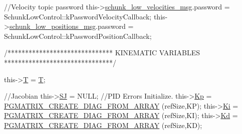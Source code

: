 \begin{DoxyCode}
        \textcolor{comment}{//Velocity topic password}
        this->\hyperlink{classCartesian__controller_af59178c57bdd73d9eb474577247bbe40}{schunk\_low\_velocities\_msg}.password = 
      SchunkLowControl::kPasswordVelocityCallback;
        this->\hyperlink{classCartesian__controller_a2dd700542bd6243eef10d34811055584}{schunk\_low\_positions\_msg}.password  = 
      SchunkLowControl::kPasswordPositionCallback;

        \textcolor{comment}{/******************************}
\textcolor{comment}{                KINEMATIC VARIABLES}
\textcolor{comment}{        *******************************/}

        this->\hyperlink{classCartesian__controller_a35c6ddbb9624878f2807ff644a33e832}{T} = \hyperlink{classCartesian__controller_a35c6ddbb9624878f2807ff644a33e832}{T};

        \textcolor{comment}{//Jacobian}
        this->\hyperlink{classCartesian__controller_a98fdac06d136ac3dba0102d97cd5dd36}{SJ} = NULL;
        \textcolor{comment}{//PID Errors Initialize.}
        this->\hyperlink{classCartesian__controller_a78073f51064a05d72c41723a93d9079f}{Kp} = \hyperlink{gmatrix__plus_8h_a22f3571af4a9f493e44fcd3184a2f3f0}{PGMATRIX\_CREATE\_DIAG\_FROM\_ARRAY}
      (refSize,KP);
        this->\hyperlink{classCartesian__controller_a70e495f39da706f1b589684f58343b9e}{Ki} = \hyperlink{gmatrix__plus_8h_a22f3571af4a9f493e44fcd3184a2f3f0}{PGMATRIX\_CREATE\_DIAG\_FROM\_ARRAY}
      (refSize,KI);
        this->\hyperlink{classCartesian__controller_a62394cef8a9a29eac18319a4ad579c4c}{Kd} = \hyperlink{gmatrix__plus_8h_a22f3571af4a9f493e44fcd3184a2f3f0}{PGMATRIX\_CREATE\_DIAG\_FROM\_ARRAY}
      (refSize,KD);


\end{DoxyCode}
